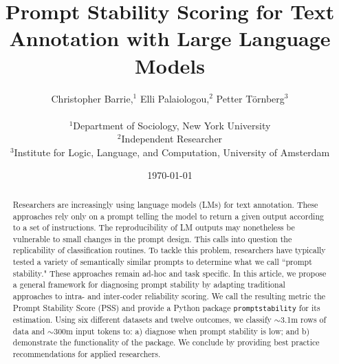 \documentclass{article}
\title{Prompt Stability Scoring for Text Annotation with Large Language Models}
\author{Christopher Barrie,$^{1}$ Elli Palaiologou,$^{2}$ Petter Törnberg$^{3}$\\
\\
\normalsize{$^{1}$Department of Sociology, New York University}\\
\normalsize{$^{2}$Independent Researcher}\\
\normalsize{$^{3}$Institute for Logic, Language, and Computation, University of Amsterdam}}
\date{\today}
\begin{document}
\maketitle

\begin{abstract}
\noindent Researchers are increasingly using language models (LMs) for text annotation. These approaches rely only on a prompt telling the model to return a given output according to a set of instructions. The reproducibility of LM outputs may nonetheless be vulnerable to small changes in the prompt design. This calls into question the replicability of classification routines. To tackle this problem, researchers have typically tested a variety of semantically similar prompts to determine what we call ``prompt stability." These approaches remain ad-hoc and task specific. In this article, we propose a general framework for diagnosing prompt stability by adapting traditional approaches to intra- and inter-coder reliability scoring. We call the resulting metric the Prompt Stability Score (PSS) and provide a Python package \texttt{promptstability} for its estimation. Using six different datasets and twelve outcomes, we classify $\sim$3.1m rows of data and $\sim$300m input tokens to: a) diagnose when prompt stability is low; and b) demonstrate the functionality of the package. We conclude by providing best practice recommendations for applied researchers.

\end{abstract}

\vfill %
\end{document}

